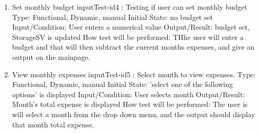 \documentclass[12pt, titlepage]{article}
\begin{document}
\begin{enumerate}
\item{Set monthly budget}
\newline
inputTest-id4 : Testing if user can set monthly budget
\newline
Type: Functional, Dynamic, manual
\newline
Initial State: no budget set
\newline
Input/Condition: User enters a numerical value
\newline
Output/Result: budget set, StorageSV is updated
\newline
How test will be performed: THhe user will enter a budget and that will then subtract the current months expenses, and give an output on the mainpage.

\item{View monthly expenses}
\newline
inputTest-id5 : Select month to view expenses.
\newline
Type: Functional, Dynamic, manual 
\newline
Initial State: 'select one of the following options' is displayed 
\newline
Input/Condition: User selects month
\newline
Output/Result: Month's total expense is displayed
\newline
How test will be performed: The user is will select a month from the drop down menu, and the output should display that month total expense.


\end{enumerate}
\end{document}

